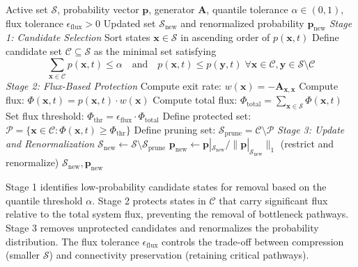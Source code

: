 \documentclass[review,onefignum,onetabnum]{siamart171218}
\begin{document}
\begin{algorithm}[H]
\caption{Flux-Protected Pruning}
\label{alg:flux-prune}
\begin{algorithmic}[1]
\REQUIRE Active set $\mathcal{S}$, probability vector $\boldsymbol{p}$, generator $\mathbf{A}$, quantile tolerance $\alpha \in (0,1)$, flux tolerance $\epsilon_{\mathrm{flux}} > 0$
\ENSURE Updated set $\mathcal{S}_{\mathrm{new}}$ and renormalized probability $\boldsymbol{p}_{\mathrm{new}}$
\STATE
\STATE \textit{Stage 1: Candidate Selection}
\STATE Sort states $\boldsymbol{x} \in \mathcal{S}$ in ascending order of $p(\boldsymbol{x}, t)$
\STATE Define candidate set $\mathcal{C} \subseteq \mathcal{S}$ as the minimal set satisfying
\begin{equation}
\sum_{\boldsymbol{x} \in \mathcal{C}} p(\boldsymbol{x}, t) \leq \alpha \quad \text{and} \quad p(\boldsymbol{x}, t) \leq p(\boldsymbol{y}, t) \; \forall \boldsymbol{x} \in \mathcal{C}, \boldsymbol{y} \in \mathcal{S} \setminus \mathcal{C}
\end{equation}
\STATE \textit{Stage 2: Flux-Based Protection}
    \STATE Compute exit rate: $w(\boldsymbol{x}) = -\mathbf{A}_{\boldsymbol{x},\boldsymbol{x}}$
    \STATE Compute flux: $\Phi(\boldsymbol{x}, t) = p(\boldsymbol{x}, t) \cdot w(\boldsymbol{x})$
\ENDFOR
\STATE Compute total flux: $\Phi_{\mathrm{total}} = \sum_{\boldsymbol{x} \in \mathcal{S}} \Phi(\boldsymbol{x}, t)$
\STATE Set flux threshold: $\Phi_{\mathrm{thr}} = \epsilon_{\mathrm{flux}} \cdot \Phi_{\mathrm{total}}$
\STATE Define protected set: $\mathcal{P} = \{\boldsymbol{x} \in \mathcal{C} : \Phi(\boldsymbol{x}, t) \geq \Phi_{\mathrm{thr}}\}$
\STATE Define pruning set: $\mathcal{S}_{\mathrm{prune}} = \mathcal{C} \setminus \mathcal{P}$
\STATE
\STATE \textit{Stage 3: Update and Renormalization}
\STATE $\mathcal{S}_{\mathrm{new}} \gets \mathcal{S} \setminus \mathcal{S}_{\mathrm{prune}}$
\STATE $\boldsymbol{p}_{\mathrm{new}} \gets \boldsymbol{p}|_{\mathcal{S}_{\mathrm{new}}} / \|\boldsymbol{p}|_{\mathcal{S}_{\mathrm{new}}}\|_1$ \quad (restrict and renormalize)
\RETURN $\mathcal{S}_{\mathrm{new}}, \boldsymbol{p}_{\mathrm{new}}$
\end{algorithmic}
\end{algorithm}

 Stage 1 identifies low-probability candidate states for removal based on the quantile threshold $\alpha$. Stage 2 protects states in $\mathcal{C}$ that carry significant flux relative to the total system flux, preventing the removal of bottleneck pathways. Stage 3 removes unprotected candidates and renormalizes the probability distribution. The flux tolerance $\epsilon_{\mathrm{flux}}$ controls the trade-off between compression (smaller $\mathcal{S}$) and connectivity preservation (retaining critical pathways).
\end{document}

